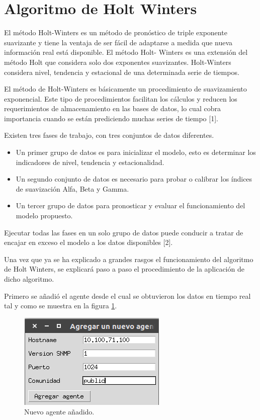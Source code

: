 \newpage
\section{Algoritmo de Holt Winters}
El método Holt-Winters es un método de pronóstico de triple exponente suavizante y tiene la ventaja de ser fácil de adaptarse a medida que nueva información real está disponible. El método Holt- Winters es una extensión del método Holt que considera solo dos exponentes suavizantes. Holt-Winters considera nivel, tendencia y estacional de una determinada serie de tiempos. 
\\ \par
El método de Holt-Winters es básicamente un procedimiento de suavizamiento exponencial. Este tipo de procedimientos facilitan los cálculos y reducen los requerimientos de almacenamiento en las bases de datos, lo cual cobra importancia cuando se están prediciendo muchas series de tiempo [1].
\\ \par

Existen tres fases de trabajo, con tres conjuntos de datos diferentes. 
\begin{itemize}
\item Un primer grupo de datos es para inicializar
el modelo, esto es determinar los indicadores de nivel, tendencia y estacionalidad. 
\item Un segundo conjunto de datos es necesario para probar o calibrar los índices de suavización Alfa, Beta y Gamma.
\item Un tercer grupo de datos para pronosticar y evaluar el funcionamiento del modelo propuesto.
\end{itemize}
Ejecutar todas las fases en un solo grupo de datos puede conducir a tratar de encajar en exceso el modelo a los datos disponibles [2].
\\ \par
Una vez que ya se ha explicado a grandes rasgos el funcionamiento del algoritmo de Holt Winters, se explicará paso a paso el procedimiento de la aplicación de dicho algoritmo.
\\ \par 
Primero se añadió el agente desde el cual se obtuvieron los datos en tiempo real tal y como se muestra en la figura \ref{image:agente}. 
\FloatBarrier
\begin{figure}[htbp!]
		\centering
			\includegraphics[width=.45 \textwidth]{images/agente}
		\caption{Nuevo agente añadido.}
		\label{image:agente}
\end{figure}
\FloatBarrier

